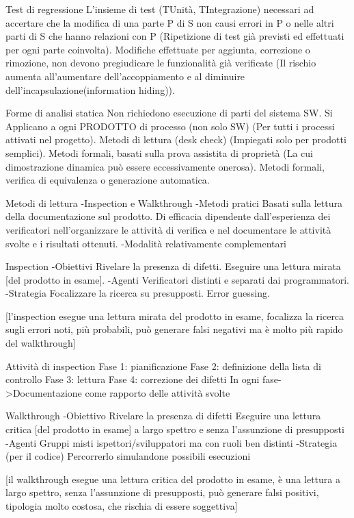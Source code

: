 \documentclass{report}
\begin{document}
Test di regressione
L’insieme di test (TUnità, TIntegrazione) necessari ad accertare che la modifica di una parte P di S non causi errori in P o nelle altri parti di S che hanno relazioni con P (Ripetizione di test già previsti ed effettuati per ogni parte coinvolta).
Modifiche effettuate per aggiunta, correzione o rimozione, non devono pregiudicare le funzionalità già verificate (Il rischio aumenta all’aumentare dell’accoppiamento e al diminuire dell’incapsulazione(information hiding)).


Forme di analisi statica
Non richiedono esecuzione di parti del sistema SW.
Si Applicano a ogni PRODOTTO di processo (non solo SW) (Per tutti i processi attivati nel progetto).
Metodi di lettura (desk check) (Impiegati solo per prodotti semplici).
Metodi formali, basati sulla prova assistita di proprietà (La cui dimostrazione dinamica può essere eccessivamente onerosa).
Metodi formali, verifica di equivalenza o generazione automatica.

Metodi di lettura
-Inspection e Walkthrough
-Metodi pratici
Basati sulla lettura della documentazione sul prodotto. Di efficacia dipendente dall’esperienza dei verificatori nell’organizzare le attività di verifica e nel documentare le attività svolte e i risultati ottenuti.
-Modalità relativamente complementari

Inspection
-Obiettivi
Rivelare la presenza di difetti.
Eseguire una lettura mirata [del prodotto in esame].
-Agenti
Verificatori distinti e separati dai programmatori.
-Strategia
Focalizzare la ricerca su presupposti.
Error guessing.

[l'inspection esegue una lettura mirata del prodotto in esame, focalizza la ricerca sugli errori noti, più probabili, può generare falsi negativi ma è molto più rapido del walkthrough]

Attività di inspection
Fase 1: pianificazione
Fase 2: definizione della lista di controllo
Fase 3: lettura
Fase 4: correzione dei difetti
In ogni fase->Documentazione come rapporto delle attività svolte

Walkthrough
-Obiettivo
Rivelare la presenza di difetti
Eseguire una lettura critica [del prodotto in esame] a largo spettro e senza l’assunzione di presupposti
-Agenti
Gruppi misti ispettori/sviluppatori ma con ruoli ben distinti
-Strategia (per il codice)
Percorrerlo simulandone possibili esecuzioni

[il walkthrough esegue una lettura critica del prodotto in esame, è una lettura a largo spettro, senza l'assunzione di presupposti, può generare falsi positivi, tipologia molto costosa, che rischia di essere soggettiva]
\end{document}

